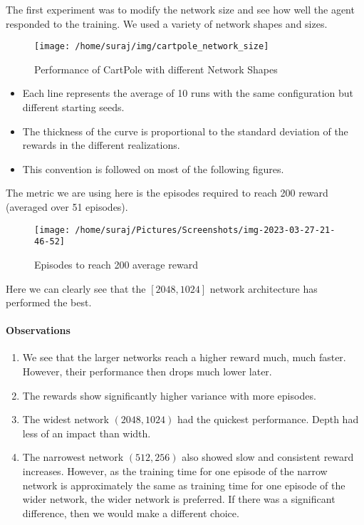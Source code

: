\documentclass[A4]{article}
\begin{document}
    The first experiment was to modify the network size and see how well the agent responded to the training.
    We used a variety of network shapes and sizes.
    \begin{figure}[H]
        \centering
        \texttt{[image: /home/suraj/img/cartpole\_network\_size]}
        \caption{Performance of CartPole with different Network Shapes}
        \label{fig:cartpole_shapes}
    \end{figure}

    \begin{itemize}
        \item Each line represents the average of 10 runs with the same configuration but different starting seeds.
        \item The thickness of the curve is proportional to the standard deviation of the rewards in the different realizations.
        \item This convention is followed on most of the following figures.
    \end{itemize}

    The metric we are using here is the episodes required to reach 200 reward (averaged over 51 episodes).
    \begin{figure}[H]
        \centering
        \texttt{[image: /home/suraj/Pictures/Screenshots/img-2023-03-27-21-46-52]}
        \caption{Episodes to reach 200 average reward}
        \label{fig:}
    \end{figure}

    Here we can clearly see that the $[2048, 1024]$ network architecture has performed the best.

    \paragraph{Observations}
    \begin{enumerate}
        \item We see that the larger networks reach a higher reward much, much faster.
        However, their performance then drops much lower later.
        \item The rewards show significantly higher variance with more episodes.
        \item The widest network $(2048, 1024)$ had the quickest performance.
        Depth had less of an impact than width.
        \item The narrowest network $(512, 256)$ also showed slow and consistent reward increases.
        However, as the training time for one episode of the narrow network is approximately the same as training time for one episode of the wider network, the wider network is preferred. If there was a significant difference, then we would make a different choice.
    \end{enumerate}
\end{document}
